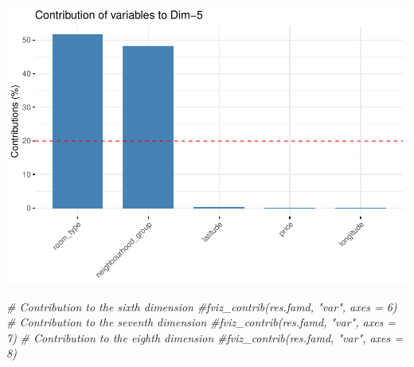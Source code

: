\documentclass[
]{article}
\newenvironment{Shaded}{\begin{snugshade}}{\end{snugshade}}
\newcommand{\CommentTok}[1]{\textcolor[rgb]{0.56,0.35,0.01}{\textit{#1}}}
\begin{document}
\includegraphics{project-code_files/figure-latex/unnamed-chunk-37-6.pdf}

\begin{Shaded}
\begin{Highlighting}[]
\CommentTok{# Contribution to the sixth dimension}
\CommentTok{#fviz_contrib(res.famd, "var", axes = 6)}
\CommentTok{# Contribution to the seventh dimension}
\CommentTok{#fviz_contrib(res.famd, "var", axes = 7)}
\CommentTok{# Contribution to the eighth dimension}
\CommentTok{#fviz_contrib(res.famd, "var", axes = 8)}
\end{Highlighting}
\end{Shaded}
\end{document}

